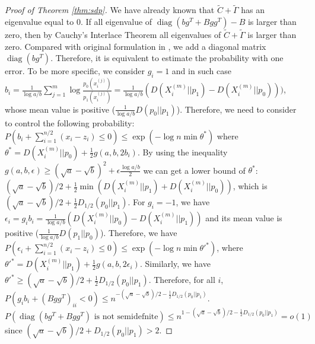 \documentclass[conference]{IEEEtran}
\DeclareMathOperator{\diag}{diag}
\begin{document}
\begin{proof}[Proof of Theorem \ref{thm:sdp}]
We have already known that $\tilde{C}+\tilde{\Gamma}$ has an eigenvalue equal to $0$.
If all eigenvalue of $\diag(bg^T + Bgg^T) - B$ is larger than zero, then by
Cauchy’s Interlace Theorem \cite{it} all eigenvalues of $\tilde{C}+\tilde{\Gamma}$ is larger than zero.
Compared with original formulation in \cite{abbe}, we add a diagonal matrix $\diag(bg^T)$.
Therefore, it is equivalent to estimate the probability with one error.
To be more specific, we consider $g_i = 1$ and in such case
$b_i = \frac{1}{\log a/b}\sum_{j=1}^m \log \frac{p_0(x_i^{(j)})}{p_1(x_i^{(j)})} = \frac{1}{\log a/b}(D(X_i^{(m)} || p_1) - 
D(X_i^{(m)} || p_0)  ))
$, whose mean value is positive ($\frac{1}{\log a/b}D(p_0||p_1)$).
Therefore, we need to consider to control the following probability:
$P(b_i + \sum_{i=1}^{n/2} (x_i - z_i) \leq 0) \leq \exp(-\log n \min \theta^*)$ 
where $\theta^* = D(X_i^{(m)} || p_0) + \frac{1}{2} g(a,b,2b_i)$.
By using the inequality $g(a,b,\epsilon) \geq (\sqrt{a} -\sqrt{b})^2 + \epsilon \frac{\log a/b}{2}$
we can get a lower bound of $\theta^*$: $(\sqrt{a} - \sqrt{b})/2 + \frac{1}{2}\min(D(X_i^{(m)} || p_1) + 
D(X_i^{(m)} || p_0))$, which is $(\sqrt{a} - \sqrt{b})/2 + \frac{1}{2}D_{1/2}(p_0||p_1)$.
For $g_i = -1$, we have $\epsilon_i = g_i b_i = \frac{1}{\log a/b}(D(X_i^{(m)} || p_0) - 
D(X_i^{(m)} || p_1)  )$ and its mean value is positive ($\frac{1}{\log a/b} D(p_1||p_0)$).
Therefore, we have $P(\epsilon_i + \sum_{i=1}^{n/2} (x_i - z_i) \leq 0) \leq \exp(-\log n \min \theta'^*)$,
where $\theta'^* = D(X_i^{(m)}||p_1) + \frac{1}{2}g(a,b,2\epsilon_i)$.
Similarly, we have $\theta'^* \geq (\sqrt{a} - \sqrt{b})/2 + \frac{1}{2}D_{1/2}(p_0||p_1)$.
Therefore, for all $i$, $P(g_i b_i + (Bgg^T)_{ii} < 0) \leq n^{-(\sqrt{a} - \sqrt{b})/2 - \frac{1}{2}D_{1/2}(p_0||p_1)}$.
$P(\diag(bg^T + Bgg^T) \textrm{ is not semidefnite}) \leq n^{1-(\sqrt{a} - \sqrt{b})/2 - \frac{1}{2}D_{1/2}(p_0||p_1)} = o(1)$
since $(\sqrt{a} - \sqrt{b})/2 + D_{1/2}(p_0||p_1) > 2$.
\end{proof}



\end{document}
